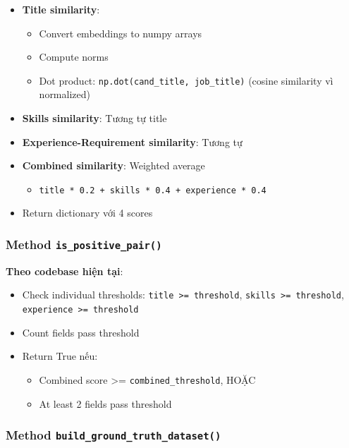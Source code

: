 \begin{itemize}
    \item \textbf{Title similarity}:
    \begin{itemize}
        \item Convert embeddings to numpy arrays
        \item Compute norms
        \item Dot product: \texttt{np.dot(cand\_title, job\_title)} (cosine similarity vì normalized)
    \end{itemize}
    
    \item \textbf{Skills similarity}: Tương tự title
    
    \item \textbf{Experience-Requirement similarity}: Tương tự
    
    \item \textbf{Combined similarity}: Weighted average
    \begin{itemize}
        \item \texttt{title * 0.2 + skills * 0.4 + experience * 0.4}
    \end{itemize}
    
    \item Return dictionary với 4 scores
\end{itemize}

\subsubsection{Method \texttt{is\_positive\_pair()}}

\textbf{Theo codebase hiện tại}:

\begin{itemize}
    \item Check individual thresholds: \texttt{title >= threshold}, \texttt{skills >= threshold}, \texttt{experience >= threshold}
    \item Count fields pass threshold
    \item Return True nếu:
    \begin{itemize}
        \item Combined score >= \texttt{combined\_threshold}, HOẶC
        \item At least 2 fields pass threshold
    \end{itemize}
\end{itemize}

\subsubsection{Method \texttt{build\_ground\_truth\_dataset()}}

